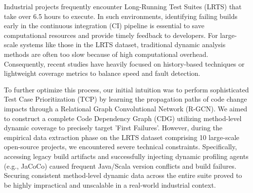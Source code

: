 


Industrial projects frequently encounter Long-Running Test Suites (LRTS) that take over 6.5 hours to execute. In such environments, identifying failing builds early in the continuous integration (CI) pipeline is essential to save computational resources and provide timely feedback to developers. For large-scale systems like those in the LRTS dataset, traditional dynamic analysis methods are often too slow because of high computational overhead. Consequently, recent studies have heavily focused on history-based techniques or lightweight coverage metrics to balance speed and fault detection.

To further optimize this process, our initial intuition was to perform sophisticated Test Case Prioritization (TCP) by learning the propagation paths of code change impacts through a Relational Graph Convolutional Network (R-GCN). We aimed to construct a complete Code Dependency Graph (CDG) utilizing method-level dynamic coverage to precisely target 'First Failures'. However, during the empirical data extraction phase on the LRTS dataset comprising 10 large-scale open-source projects, we encountered severe technical constraints. Specifically, accessing legacy build artifacts and successfully injecting dynamic profiling agents (e.g., JaCoCo) caused frequent Java/Scala version conflicts and build failures. Securing consistent method-level dynamic data across the entire suite proved to be highly impractical and unscalable in a real-world industrial context.

